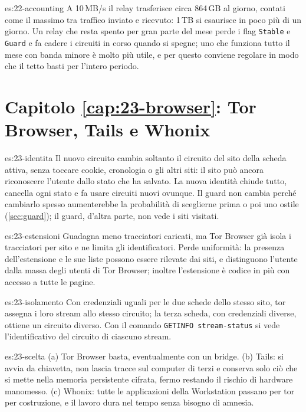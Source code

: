 \begin{soluzione}{es:22-accounting}
A 10\,MB/s il relay trasferisce circa 864\,GB al giorno, contati come il massimo tra traffico inviato e ricevuto: 1\,TB si esaurisce in poco più di un giorno. Un relay che resta spento per gran parte del mese perde i flag \texttt{Stable} e \texttt{Guard} e fa cadere i circuiti in corso quando si spegne; uno che funziona tutto il mese con banda minore è molto più utile, e per questo conviene regolare  in modo che il tetto basti per l'intero periodo.
\end{soluzione}

\section*{Capitolo \ref{cap:23-browser}: Tor Browser, Tails e Whonix}

\begin{soluzione}{es:23-identita}
Il nuovo circuito cambia soltanto il circuito del sito della scheda attiva, senza toccare cookie, cronologia o gli altri siti: il sito può ancora riconoscere l'utente dallo stato che ha salvato. La nuova identità chiude tutto, cancella ogni stato e fa usare circuiti nuovi ovunque. Il guard non cambia perché cambiarlo spesso aumenterebbe la probabilità di sceglierne prima o poi uno ostile (\cref{sec:guard}); il guard, d'altra parte, non vede i siti visitati.
\end{soluzione}

\begin{soluzione}{es:23-estensioni}
Guadagna meno tracciatori caricati, ma Tor Browser già isola i tracciatori per sito e ne limita gli identificatori. Perde uniformità: la presenza dell'estensione e le sue liste possono essere rilevate dai siti, e distinguono l'utente dalla massa degli utenti di Tor Browser; inoltre l'estensione è codice in più con accesso a tutte le pagine.
\end{soluzione}

\begin{soluzione}{es:23-isolamento}
Con credenziali uguali per le due schede dello stesso sito, tor assegna i loro stream allo stesso circuito; la terza scheda, con credenziali diverse, ottiene un circuito diverso. Con il comando \texttt{GETINFO stream-status} si vede l'identificativo del circuito di ciascuno stream.
\end{soluzione}

\begin{soluzione}{es:23-scelta}
(a) Tor Browser basta, eventualmente con un bridge. (b) Tails: si avvia da chiavetta, non lascia tracce sul computer di terzi e conserva solo ciò che si mette nella memoria persistente cifrata, fermo restando il rischio di hardware manomesso. (c) Whonix: tutte le applicazioni della Workstation passano per tor per costruzione, e il lavoro dura nel tempo senza bisogno di amnesia.
\end{soluzione}

